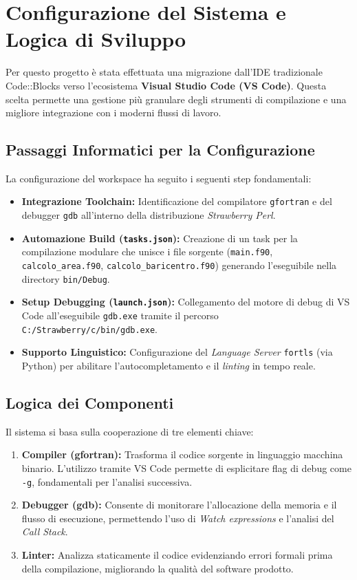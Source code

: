 \chapter{Configurazione del Sistema e Logica di Sviluppo}

Per questo progetto è stata effettuata una migrazione dall'IDE tradizionale Code::Blocks verso l'ecosistema \textbf{Visual Studio Code (VS Code)}. Questa scelta permette una gestione più granulare degli strumenti di compilazione e una migliore integrazione con i moderni flussi di lavoro.

\section{Passaggi Informatici per la Configurazione}
La configurazione del workspace ha seguito i seguenti step fondamentali:
\begin{itemize}
    \item \textbf{Integrazione Toolchain:} Identificazione del compilatore \texttt{gfortran} e del debugger \texttt{gdb} all'interno della distribuzione \textit{Strawberry Perl}.
    \item \textbf{Automazione Build (\texttt{tasks.json}):} Creazione di un task per la compilazione modulare che unisce i file sorgente
          (\texttt{main.f90}, \texttt{calcolo\_area.f90}, \texttt{calcolo\_baricentro.f90})
          generando l'eseguibile nella directory \texttt{bin/Debug}.
    \item \textbf{Setup Debugging (\texttt{launch.json}):} Collegamento del motore di debug di VS Code all'eseguibile \texttt{gdb.exe}
          tramite il percorso \texttt{C:/Strawberry/c/bin/gdb.exe}.
    \item \textbf{Supporto Linguistico:} Configurazione del \textit{Language Server} \texttt{fortls} (via Python) per abilitare l'autocompletamento e il \textit{linting} in tempo reale.
\end{itemize}

\section{Logica dei Componenti}
Il sistema si basa sulla cooperazione di tre elementi chiave:
\begin{enumerate}
    \item \textbf{Compiler (gfortran):} Trasforma il codice sorgente in linguaggio macchina binario. L'utilizzo tramite VS Code permette di esplicitare flag di debug come \texttt{-g}, fondamentali per l'analisi successiva.
    \item \textbf{Debugger (gdb):} Consente di monitorare l'allocazione della memoria e il flusso di esecuzione, permettendo l'uso di \textit{Watch expressions} e l'analisi del \textit{Call Stack}.
    \item \textbf{Linter:} Analizza staticamente il codice evidenziando errori formali prima della compilazione, migliorando la qualità del software prodotto.
\end{enumerate}

